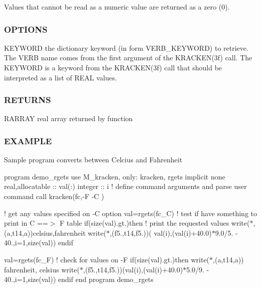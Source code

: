 Values that cannot be read as a numeric value are returned as a zero (0).

\subsubsection*{O\+P\+T\+I\+O\+NS}

K\+E\+Y\+W\+O\+RD the dictionary keyword (in form V\+E\+R\+B\+\_\+\+K\+E\+Y\+W\+O\+RD) to retrieve. The V\+E\+RB name comes from the first argument of the K\+R\+A\+C\+K\+E\+N(3f) call. The K\+E\+Y\+W\+O\+RD is a keyword from the K\+R\+A\+C\+K\+E\+N(3f) call that should be interpreted as a list of R\+E\+AL values.

\subsubsection*{R\+E\+T\+U\+R\+NS}

R\+A\+R\+R\+AY real array returned by function

\subsubsection*{E\+X\+A\+M\+P\+LE}

Sample program converts between Celcius and Fahrenheit

program demo\+\_\+rgets use M\+\_\+kracken, only\+: kracken, rgets implicit none real,allocatable \+:\+: val(\+:) integer \+:\+: i ! define command arguments and parse user command call kracken(\textquotesingle{}fc\textquotesingle{},\textquotesingle{}-\/F -\/C\textquotesingle{} )

! get any values specified on -\/C option val=rgets(\textquotesingle{}fc\+\_\+C\textquotesingle{}) ! test if have something to print in C ==$>$ F table if(size(val).gt.)then ! print the requested values write($\ast$,\textquotesingle{}(a,t14,a)\textquotesingle{})\textquotesingle{}celsius\textquotesingle{},\textquotesingle{}fahrenheit\textquotesingle{} write($\ast$,\textquotesingle{}(f5.,t14,f5.)\textquotesingle{})( val(i),(val(i)+40.0)$\ast$9.0/5. -\/ 40.,i=1,size(val)) endif

val=rgets(\textquotesingle{}fc\+\_\+F\textquotesingle{}) ! check for values on -\/F if(size(val).gt.)then write($\ast$,\textquotesingle{}(a,t14,a)\textquotesingle{}) \textquotesingle{}fahrenheit\textquotesingle{}, \textquotesingle{}celsius\textquotesingle{} write($\ast$,\textquotesingle{}(f5.,t14,f5.)\textquotesingle{})(val(i),(val(i)+40.0)$\ast$5.0/9. -\/ 40.,i=1,size(val)) endif end program demo\+\_\+rgets

